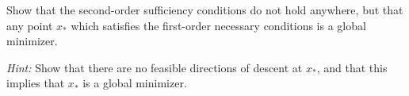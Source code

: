 Show that the second-order sufficiency conditions do not hold anywhere, but that any point $x_*$ which satisfies the
first-order necessary conditions is a global minimizer.

\textit{Hint: } Show that there are no feasible directions of descent at $x_*$, and that this implies that $x_*$ is a
global minimizer.

\begin{solution}
    \ \\
    \vfill
\end{solution}